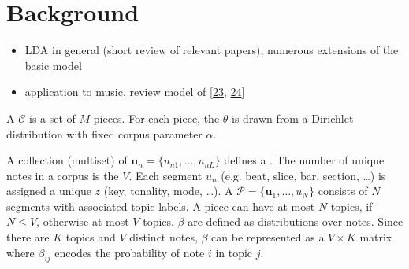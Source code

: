 \documentclass[letterpaper,10pt,english]{sphinxmanual}
\begin{document}
\section{Background}
\label{\detokenize{topic_modeling:background}}\begin{itemize}
\item {} 
\sphinxAtStartPar
LDA in general (short review of relevant papers), numerous
extensions of the basic model

\item {} 
\sphinxAtStartPar
application to music, review model of
{[}\hyperlink{cite.8_bibliography:id61}{23}, \hyperlink{cite.8_bibliography:id62}{24}{]}

\end{itemize}

\sphinxAtStartPar
A  \(\mathcal C\) is a set of \(M\) pieces. For each
piece, the  \(\theta\) is drawn from a
Dirichlet distribution with fixed corpus parameter \(\alpha.\)

\sphinxAtStartPar
A collection (multiset) of 
\(\boldsymbol{u}_n = \{u_{n1},\ldots,u_{nL}\}\) defines a
. The number of unique notes in a corpus is the  \(V\). Each segment \({u}_n\) (e.g. beat, slice, bar,
section, …) is assigned a unique  \(z\) (key,
tonality, mode, …). A 
\(\mathcal P = \{\boldsymbol{u}_1, \ldots, u_N\}\) consists of
\(N\) segments with associated topic labels. A piece can have at
most \(N\) topics, if \(N\leq V\), otherwise at most \(V\)
topics.  \(\beta\) are defined as distributions over
notes.
Since there are \(K\) topics and \(V\) distinct notes,
\(\beta\) can be represented as a \(V \times K\) matrix where
\(\beta_{ij}\) encodes the probability of note \(i\) in topic
\(j\).
\end{document}
